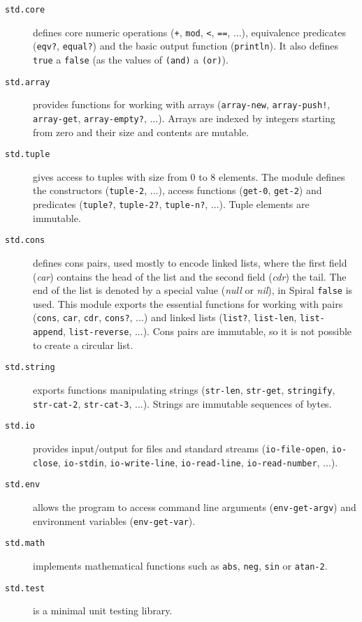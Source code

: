 \begin{description}
  \item[\texttt{std.core}] defines core numeric operations (\texttt{+},
    \texttt{mod}, \texttt{<}, \texttt{==}, ...), equivalence predicates
    (\texttt{eqv?}, \texttt{equal?}) and the basic output function
    (\texttt{println}). It also defines \texttt{true} a \texttt{false} (as the
    values of \texttt{(and)} a \texttt{(or)}).

  \item[\texttt{std.array}] provides functions for working with arrays
    (\texttt{array-new}, \texttt{array-push!}, \texttt{array-get},
    \texttt{array-empty?}, ...). Arrays are indexed by integers starting from
    zero and their size and contents are mutable.

  \item[\texttt{std.tuple}] gives access to tuples with size from 0 to 8
    elements. The module defines the constructors (\texttt{tuple-2}, ...),
    access functions (\texttt{get-0}, \texttt{get-2}) and predicates
    (\texttt{tuple?}, \texttt{tuple-2?}, \texttt{tuple-n?}, ...). Tuple elements
    are immutable.

  \item[\texttt{std.cons}] defines cons pairs, used mostly to encode linked
    lists, where the first field (\emph{car}) contains the head of the list and
    the second field (\emph{cdr}) the tail. The end of the list is denoted by a
    special value (\emph{null} or \emph{nil}), in Spiral \texttt{false} is used.
    This module exports the essential functions for working with pairs
    (\texttt{cons}, \texttt{car}, \texttt{cdr}, \texttt{cons?}, ...) and linked
    lists (\texttt{list?}, \texttt{list-len}, \texttt{list-append},
    \texttt{list-reverse}, ...). Cons pairs are immutable, so it is not possible
    to create a circular list.

  \item[\texttt{std.string}] exports functions manipulating strings
    (\texttt{str-len}, \texttt{str-get}, \texttt{stringify}, \texttt{str-cat-2},
    \texttt{str-cat-3}, ...). Strings are immutable sequences of bytes.

  \item[\texttt{std.io}] provides input/output for files and standard streams
    (\texttt{io-file-open}, \texttt{io-close}, \texttt{io-stdin},
    \texttt{io-write-line}, \texttt{io-read-line}, \texttt{io-read-number},
    ...).

  \item[\texttt{std.env}] allows the program to access command line arguments
    (\texttt{env-get-argv}) and environment variables (\texttt{env-get-var}).

  \item[\texttt{std.math}] implements mathematical functions such as
    \texttt{abs}, \texttt{neg}, \texttt{sin} or \texttt{atan-2}.

  \item[\texttt{std.test}] is a minimal unit testing library.
\end{description}


